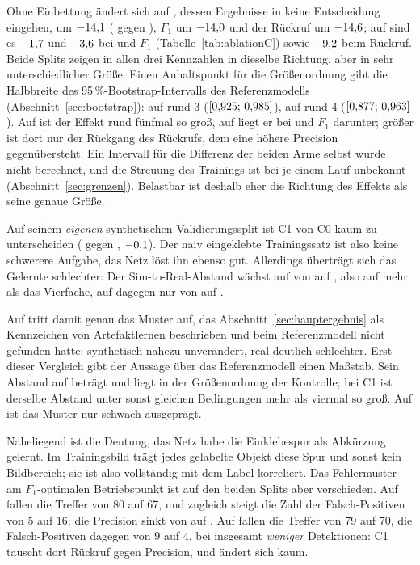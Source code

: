 

 Ohne Einbettung ändert sich auf , dessen
Ergebnisse in keine Entscheidung eingehen, \mAPfifty{} um
\textbf{$-14{,}1$\PP} (\zCOneTestMap{} gegen \zCZeroTestMap), $F_1$ um
$-14{,}0$\PP{} und der Rückruf um $-14{,}6$\PP; auf 
sind es $-1{,}7$ und $-3{,}6$\PP{} bei \mAPfifty{} und $F_1$
(Tabelle~\ref{tab:ablationC}) sowie $-9{,}2$\PP{} beim Rückruf. Beide
Splits zeigen in allen drei Kennzahlen in dieselbe Richtung, aber in sehr
unterschiedlicher Größe. Einen Anhaltspunkt für die Größenordnung gibt die
Halbbreite des 95\,\%-Bootstrap-Intervalls des Referenzmodells
(Abschnitt~\ref{sec:bootstrap}): auf  rund 3\PP{}
($[0{,}925;\,0{,}985]$), auf  rund 4\PP{}
($[0{,}877;\,0{,}963]$). Auf  ist der Effekt rund fünfmal so
groß, auf  liegt er bei \mAPfifty{} und $F_1$ darunter; größer ist
dort nur der Rückgang des Rückrufs, dem eine höhere Precision gegenübersteht.
Ein Intervall für die Differenz der beiden Arme selbst wurde nicht berechnet,
und die Streuung des Trainings ist bei je einem Lauf unbekannt
(Abschnitt~\ref{sec:grenzen}). Belastbar ist deshalb eher die Richtung des
Effekts als seine genaue Größe.

 Auf seinem \emph{eigenen} synthetischen
Validierungssplit ist C1 von C0 kaum zu unterscheiden (\zCOneSval{}
gegen \zCZeroSval{} \mAPfifty, $-0{,}1$\PP). Der naiv eingeklebte
Trainingssatz ist also keine schwerere Aufgabe, das Netz löst ihn ebenso gut.
Allerdings überträgt sich das Gelernte schlechter: Der Sim-to-Real-Abstand wächst auf
 von \zgapCZeroTest{} auf \zgapCOneTest\PP, also auf mehr als das
Vierfache, auf  dagegen nur von \zgapCZeroVal{} auf
\zgapCOneVal\PP.

Auf  tritt damit genau das Muster auf, das
Abschnitt~\ref{sec:hauptergebnis} als Kennzeichen von Artefaktlernen
beschrieben und beim Referenzmodell nicht gefunden hatte: synthetisch nahezu
unverändert, real deutlich schlechter. Erst dieser Vergleich gibt der Aussage
über das Referenzmodell einen Maßstab. Sein Abstand auf  beträgt
\zsimRealTest\PP{} und liegt in der Größenordnung der Kontrolle; bei C1 ist derselbe
Abstand unter sonst gleichen Bedingungen mehr als viermal so groß. Auf
 ist das Muster nur schwach ausgeprägt.

 Naheliegend
ist die Deutung, das Netz habe die Einklebespur als Abkürzung gelernt. Im
Trainingsbild trägt jedes gelabelte Objekt diese Spur und sonst kein
Bildbereich; sie ist also vollständig mit dem Label korreliert. Das Fehlermuster am
$F_1$-optimalen Betriebspunkt ist auf den beiden Splits aber verschieden. Auf
 fallen die Treffer von 80 auf 67, und zugleich steigt die Zahl der
Falsch-Positiven von 5 auf 16; die Precision sinkt von \zCZeroTestPrec{} auf
\zCOneTestPrec. Auf  fallen die Treffer von 79 auf 70, die
Falsch-Positiven dagegen von 9 auf 4, bei insgesamt \emph{weniger}
Detektionen: C1 tauscht dort Rückruf gegen Precision, und \mAPfifty{} ändert
sich kaum.

